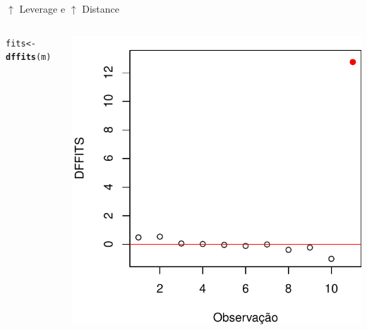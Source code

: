\documentclass{beamer}\usepackage[]{graphicx}\usepackage[]{color}
\makeatletter
\newcommand{\hlstd}[1]{\textcolor[rgb]{0.345,0.345,0.345}{#1}}%
\newcommand{\hlkwb}[1]{\textcolor[rgb]{0.69,0.353,0.396}{#1}}%
\newcommand{\hlkwd}[1]{\textcolor[rgb]{0.737,0.353,0.396}{\textbf{#1}}}%
\newenvironment{kframe}{%
 \def\at@end@of@kframe{}%
 \ifinner\ifhmode%
  \def\at@end@of@kframe{\end{minipage}}%
  \begin{minipage}{\columnwidth}%
 \fi\fi%
 \def\FrameCommand##1{\hskip\@totalleftmargin \hskip-\fboxsep
 \colorbox{shadecolor}{##1}\hskip-\fboxsep
     \hskip-\linewidth \hskip-\@totalleftmargin \hskip\columnwidth}%
 \MakeFramed {\advance\hsize-\width
   \@totalleftmargin\z@ \linewidth\hsize
   \@setminipage}}%
 {\par\unskip\endMakeFramed%
 \at@end@of@kframe}
\newenvironment{knitrout}{}{} %
\renewenvironment{knitrout}{\setlength{\topsep}{0mm}}{}
\makeatother
\begin{document}
\begin{frame}{$\uparrow$ Leverage e $\uparrow$ Distance}
\begin{columns}[c]
\begin{knitrout}\tiny
{}\color{fgcolor}\begin{kframe}
\begin{alltt}
\hlstd{fits} \hlkwb{<-} \hlkwd{dffits}\hlstd{(m)}
\end{alltt}
\end{kframe}
\includegraphics[width=1\linewidth]{figure/inf2-1} 

\end{knitrout}

\end{columns}
\end{frame}
\end{document}
